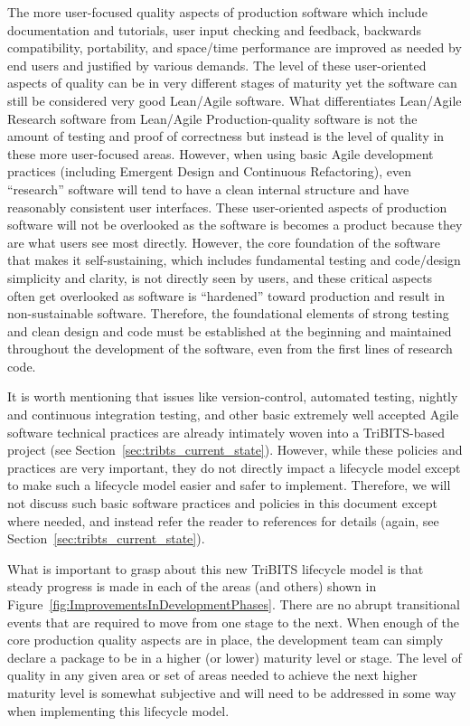 \documentclass[11pt]{SANDreport}
\begin{document}
The more user-focused quality aspects of production software which
include documentation and tutorials, user input checking and feedback,
backwards compatibility, portability, and space/time performance are
improved as needed by end users and justified by various demands.  The
level of these user-oriented aspects of quality can be in very
different stages of maturity yet the software can still be considered
very good Lean/Agile software.  What differentiates Lean/Agile
Research software from Lean/Agile Production-quality software is not
the amount of testing and proof of correctness but instead is the
level of quality in these more user-focused areas.  However, when
using basic Agile development practices (including Emergent Design and
Continuous Refactoring), even ``research'' software will tend to have
a clean internal structure and have reasonably consistent user
interfaces.  These user-oriented aspects of production software will
not be overlooked as the software is becomes a product because they
are what users see most directly.  However, the core foundation of the
software that makes it self-sustaining, which includes fundamental
testing and code/design simplicity and clarity, is not directly seen
by users, and these critical aspects often get overlooked as software
is ``hardened'' toward production and result in non-sustainable
software.  Therefore, the foundational elements of strong testing and
clean design and code must be established at the beginning and
maintained throughout the development of the software, even from the
first lines of research code.

It is worth mentioning that issues like version-control, automated
testing, nightly and continuous integration testing, and other basic
extremely well accepted Agile software technical practices are already
intimately woven into a TriBITS-based project (see
Section~\ref{sec:tribts_current_state}).  However, while these
policies and practices are very important, they do not directly impact
a lifecycle model except to make such a lifecycle model easier and
safer to implement.  Therefore, we will not discuss such basic
software practices and policies in this document except where needed,
and instead refer the reader to references for details (again, see
Section~\ref{sec:tribts_current_state}).

What is important to grasp about this new TriBITS lifecycle model is
that steady progress is made in each of the areas (and others) shown
in Figure~\ref{fig:ImprovementsInDevelopmentPhases}.  There are no
abrupt transitional events that are required to move from one stage to
the next.  When enough of the core production quality aspects are in
place, the development team can simply declare a package to be in a
higher (or lower) maturity level or stage.  The level of quality in
any given area or set of areas needed to achieve the next higher
maturity level is somewhat subjective and will need to be addressed in
some way when implementing this lifecycle model.
\end{document}
